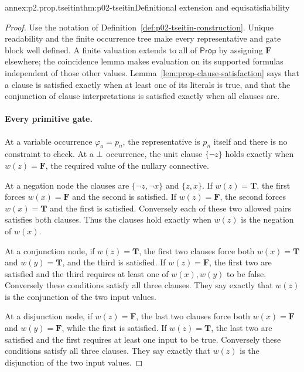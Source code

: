 \begin{annexitem}{annex:p2.prop.tseitin}{thm:p02-tseitin}{Definitional extension and equisatisfiability}
\begin{proof}
Use the notation of Definition~\ref{def:p02-tseitin-construction}.
Unique readability and the finite occurrence tree make every representative
and gate block well defined.  A finite valuation extends to all of \(\mathsf{Prop}\)
by assigning \(\mathbf{F}\) elsewhere; the coincidence lemma makes evaluation
on its supported formulas independent of those other values.
Lemma~\ref{lem:prop-clause-satisfaction} says that a clause is satisfied
exactly when at least one of its literals is true, and that the conjunction
of clause interpretations is satisfied exactly when all clauses are.

\paragraph{Every primitive gate.}
At a variable occurrence \(\varphi_a=p_n\), the representative is \(p_n\)
itself and there is no constraint to check.  At a \(\bot\) occurrence,
the unit clause \(\{\neg z\}\) holds exactly when \(w(z)=\mathbf{F}\), the
required value of the nullary connective.

At a negation node the clauses are \(\{\neg z,\neg x\}\) and
\(\{z,x\}\).  If \(w(z)=\mathbf{T}\), the first forces \(w(x)=\mathbf{F}\)
and the second is satisfied.  If \(w(z)=\mathbf{F}\), the second forces
\(w(x)=\mathbf{T}\) and the first is satisfied.  Conversely each of these two
allowed pairs satisfies both clauses.  Thus the clauses hold exactly when
\(w(z)\) is the negation of \(w(x)\).

At a conjunction node, if \(w(z)=\mathbf{T}\), the first two clauses force
both \(w(x)=\mathbf{T}\) and \(w(y)=\mathbf{T}\), and the third is satisfied.
If \(w(z)=\mathbf{F}\), the first two are satisfied and the third requires
at least one of \(w(x),w(y)\) to be false.  Conversely these conditions
satisfy all three clauses.  They say exactly that \(w(z)\) is the
conjunction of the two input values.

At a disjunction node, if \(w(z)=\mathbf{F}\), the last two clauses force
both \(w(x)=\mathbf{F}\) and \(w(y)=\mathbf{F}\), while the first is satisfied.
If \(w(z)=\mathbf{T}\), the last two are satisfied and the first requires
at least one input to be true.  Conversely these conditions satisfy all
three clauses.  They say exactly that \(w(z)\) is the disjunction of the
two input values.


\end{proof}
\end{annexitem}
